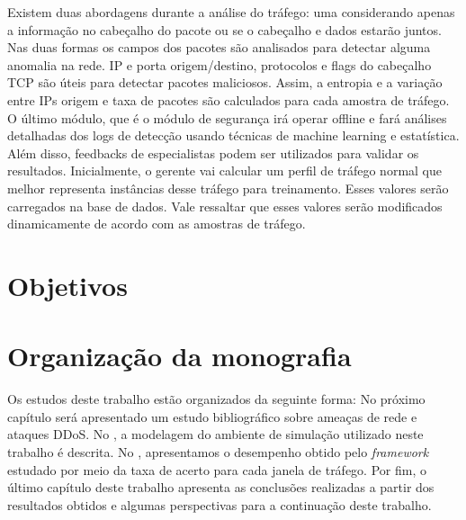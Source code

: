Existem duas abordagens durante a análise do tráfego: uma considerando apenas a informação no cabeçalho do pacote ou se o cabeçalho e dados estarão juntos. Nas duas formas os campos dos pacotes são analisados para detectar alguma anomalia na rede. IP e porta origem/destino, protocolos e flags do cabeçalho TCP são úteis para detectar pacotes maliciosos. Assim, a entropia e a variação entre IPs origem e taxa de pacotes são calculados para cada amostra de tráfego.
O último módulo, que é o módulo de segurança irá operar offline e fará análises detalhadas dos logs de detecção usando técnicas de machine learning e estatística. Além disso, feedbacks de especialistas podem ser utilizados para validar os resultados. Inicialmente, o gerente vai calcular um perfil de tráfego normal que melhor representa instâncias desse tráfego para treinamento. Esses valores serão carregados na base de dados. Vale ressaltar que esses valores serão modificados dinamicamente de acordo com as amostras de tráfego. 

\section{Objetivos}

\section{Organização da monografia}
Os estudos deste trabalho estão organizados da seguinte forma: No próximo capítulo será apresentado um estudo bibliográfico sobre ameaças de rede e ataques DDoS. No , a modelagem do ambiente de simulação utilizado neste trabalho é descrita. No , apresentamos o desempenho obtido pelo \textit{framework} estudado por meio da taxa de acerto para cada janela de tráfego. Por fim, o último capítulo deste trabalho apresenta as conclusões realizadas a partir dos resultados obtidos e algumas perspectivas para a continuação deste trabalho. 